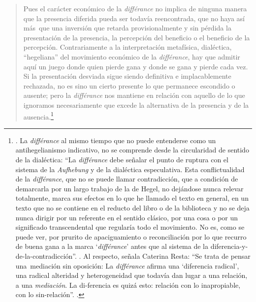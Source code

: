 \begin{quote}
Pues el carácter económico de la \emph{différance} no implica de ninguna manera que la presencia diferida pueda ser todavía reencontrada, que no haya así más~que una inversión que retarda provisionalmente y sin pérdida la presentación de la presencia, la percepción del beneficio o el beneficio de la percepción. Contrariamente a la interpretación metafísica, dialéctica, \enquote{hegeliana} del movimiento económico de la \emph{différance}, hay que admitir aquí un juego donde quien pierde gana y donde se gana y pierde cada vez. Si la presentación desviada sigue siendo definitiva e implacablemente rechazada, no es sino un cierto presente lo que permanece escondido o ausente; pero la \emph{différance} nos mantiene en relación con aquello de lo que ignoramos necesariamente que excede la alternativa de la presencia y de la ausencia.\footnote{\cite[21]{@6983-DERRIDA1989}. La \emph{différance} al mismo tiempo que no puede entenderse como un antihegelianismo indicativo, no se comprende desde la circularidad de sentido de la dialéctica: \linebreak \enquote{La \emph{différance} debe señalar el punto de ruptura con el sistema de la \emph{Aufhebung} y de la dialéctica especulativa. Esta conflictualidad de la \emph{différance}, que no se puede llamar contradicción, que a condición de demarcarla por un largo trabajo de la de Hegel, no dejándose nunca relevar totalmente, marca sus efectos en lo que he llamado el texto en general, en un texto que no se contiene en el reducto del libro o de la biblioteca y no se deja nunca dirigir por un referente en el sentido clásico, por una cosa o por un significado transcendental que regularía todo el movimiento. No es, como se puede ver, por prurito de apaciguamiento o reconciliación por lo que recurro de buena gana a la marca \enquote{\emph{différance}} antes que al sistema de la diferencia-y-de-la-contradicción}. \cite[58]{@6985-DERRIDA1977}. Al respecto, señala Caterina Resta: \enquote{Se trata de pensar una~mediación sin oposición: La \emph{différance} afirma una \enquote{diferencia radical}, una radical alteridad y heterogeneidad que todavía dan lugar a una relación, a una \emph{mediación}. La di-ferencia es quizá esto: relación con lo inapropiable, con lo sin-relación}. \cite[123]{@6986-RESTA1990}.}

\end{quote}


